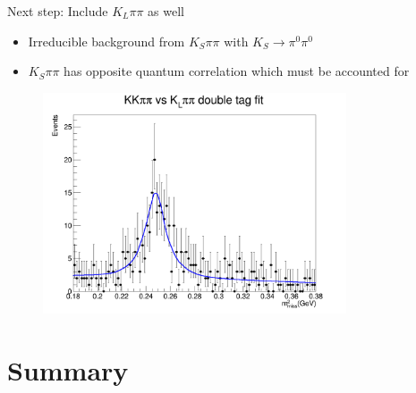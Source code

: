 \documentclass{beamer}
\begin{document}
\begin{frame}{Next step: Include $K_L\pi\pi$ as well}
  \begin{itemize}
    \item{Irreducible background from $K_S\pi\pi$ with $K_S\to\pi^0\pi^0$}
    \item{$K_S\pi\pi$ has opposite quantum correlation which must be accounted for}
  \end{itemize}
  \begin{figure}
    \includegraphics[width = 0.8\textwidth]{Plots/KLpipi_Inclusive_DoubleTagYield.png}
  \end{figure}
\end{frame}
  

\section{Summary}
\end{document}
